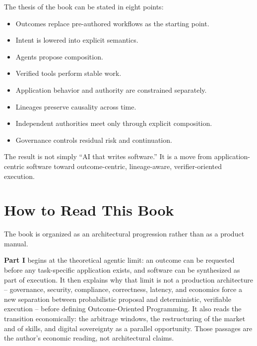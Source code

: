 \documentclass[10pt,oneside,openany]{book}
\begin{document}
\noindent\begin{minipage}{\linewidth}
The thesis of the book can be stated in eight points:

{\sffamily\small
\begin{itemize}\setlength{\itemsep}{1pt}\setlength{\parskip}{0pt}
\item Outcomes replace pre-authored workflows as the starting point.
\item Intent is lowered into explicit semantics.
\item Agents propose composition.
\item Verified tools perform stable work.
\item Application behavior and authority are constrained separately.
\item Lineages preserve causality across time.
\item Independent authorities meet only through explicit composition.
\item Governance controls residual risk and continuation.
\end{itemize}}
\end{minipage}
\vspace{2pt}


The result is not simply ``AI that writes software.'' It is a move from application-centric software toward outcome-centric, lineage-aware, verifier-oriented execution.

\tableofcontents
\clearpage

\chapter*{How to Read This Book}
The book is organized as an architectural progression rather than as a product manual.

\textbf{Part I} begins at the theoretical agentic limit: an outcome can be requested before any task-specific application exists, and software can be synthesized as part of execution. It then explains why that limit is not a production architecture -- governance, security, compliance, correctness, latency, and economics force a new separation between probabilistic proposal and deterministic, verifiable execution -- before defining Outcome-Oriented Programming. It also reads the transition economically: the arbitrage windows, the restructuring of the market and of skills, and digital sovereignty as a parallel opportunity. Those passages are the author's economic reading, not architectural claims.
\end{document}

